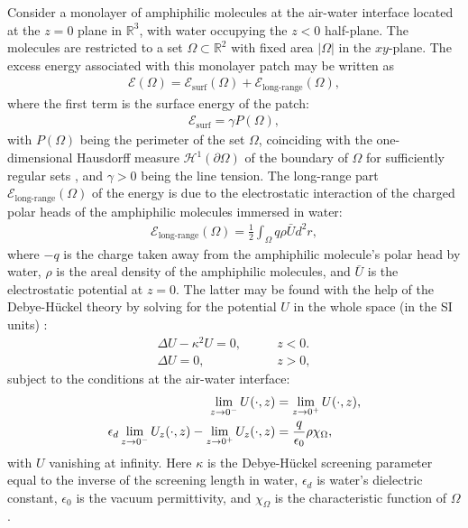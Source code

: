\documentclass[11pt]{article}
\numberwithin{statement}{section}
\numberwithin{equation}{section}
\theoremstyle{remark}
\newcommand{\R}{\mathbb R} 				%
\begin{document}
Consider a monolayer of amphiphilic molecules at the air-water
interface located at the $z = 0$ plane in $\R^3$, with water occupying
the $z < 0$ half-plane. The molecules are restricted to a set
$\Omega \subset \R^2$ with fixed area $|\Omega|$ in the
$xy$-plane. The excess energy associated with this monolayer patch may
be written as
\begin{align}
  \label{eq:E12}
  \mathcal E(\Omega) = \mathcal E_\mathrm{surf}(\Omega) + \mathcal
  E_\text{long-range}(\Omega), 
\end{align}
where the first term is the surface energy of the patch:
\begin{align}
  \label{eq:Esurf}
  \mathcal E_\text{surf} = \gamma P(\Omega), 
\end{align}
with $P(\Omega)$ being the perimeter of the set $\Omega$, coinciding
with the one-dimensional Hausdorff measure
$\mathcal H^1(\partial \Omega)$ of the boundary of $\Omega$ for
sufficiently regular sets \cite{ambrosio}, and $\gamma > 0$ being
the line tension. The long-range part
$\mathcal E_\text{long-range}(\Omega)$ of the energy is due to the
electrostatic interaction of the charged polar heads of the
amphiphilic molecules immersed in water:
\begin{align}
  \label{eq:Elr}
  \mathcal E_\text{long-range}(\Omega) = \frac12 \int_\Omega q \rho
  \bar U d^2 r, 
\end{align}
where $-q$ is the charge taken away from the amphiphilic molecule's
polar head by water, $\rho$ is the areal density of the amphiphilic
molecules, and $\bar U$ is the electrostatic potential at $z = 0$. The
latter may be found with the help of the Debye-H\"uckel theory by
solving for the potential $U$ in the whole space (in the SI units)
\cite{andelman87}:
\begin{align}
  \Delta U - \kappa^2 U = 0, & \qquad z < 0. \label{DUm} \\
  \Delta U = 0, & \qquad z > 0,
  \end{align}
  subject to the conditions at the air-water interface:
\begin{align}
  \lim_{z \to 0^-} U(\cdot, z) &= \lim_{z \to 0^+} U(\cdot, z),\\
  \epsilon_d \lim_{z \to 0^-} U_z(\cdot, z) - \lim_{z \to 0^+}
  U_z(\cdot, z) &= {q \over \epsilon_0} \rho \chi_\Omega, \label{Uzpm}
\end{align}
with $U$ vanishing at infinity.  Here $\kappa$ is the Debye-H\"uckel
screening parameter equal to the inverse of the screening length in
water, $\epsilon_d$ is water's dielectric constant, $\epsilon_0$ is
the vacuum permittivity, and $\chi_\Omega$ is the characteristic
function of $\Omega$.
\end{document}
